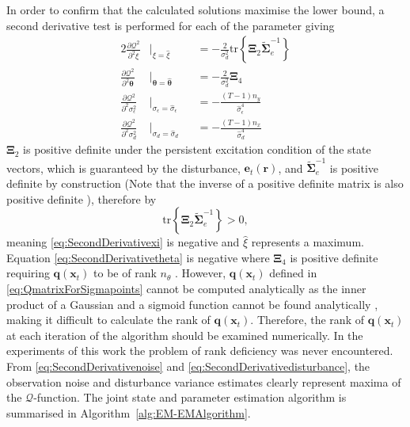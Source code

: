 \documentclass[]{article}
\begin{document}
In order to confirm that the calculated solutions maximise the lower bound, a second derivative test is performed for each of the parameter giving
\begin{alignat}{2}%
 \frac{\partial \mathcal Q^2}{\partial^2\xi}&\biggr\rvert_{\xi=\hat{\xi}}&&=-\frac{2}{\sigma_d^2}\mathrm{tr}\left\lbrace \boldsymbol\Xi_2 \tilde{\boldsymbol\Sigma}_e^{-1}\right\rbrace \label{eq:SecondDerivativexi}\\
 \frac{\partial \mathcal Q^2}{\partial^2\boldsymbol\theta}&\biggr\rvert_{\boldsymbol\theta=\hat{\boldsymbol\theta}}&&=-\frac{2}{\sigma_d^2}\boldsymbol\Xi_4 \label{eq:SecondDerivativetheta} \\
 \frac{\partial \mathcal Q^2}{\partial^2\sigma_{\epsilon}^2}&\biggr\rvert_{\sigma_{\epsilon}=\hat{\sigma}_{\epsilon}}&&=-\frac{(T-1)n_y}{\hat{\sigma}_{\epsilon}^4} \label{eq:SecondDerivativenoise} \\
 \frac{\partial \mathcal Q^2}{\partial^2\sigma_{d}^2}&\biggr\rvert_{{\sigma}_{d}=\hat{\sigma}_{d}}&&= -\frac{(T-1)n_x}{\hat{\sigma}_{d}^4} \label{eq:SecondDerivativedisturbance}
\end{alignat}
$\boldsymbol\Xi_2$ is positive definite under the persistent excitation condition of the state vectors, which is guaranteed by the disturbance, $\mathbf{e}_t(\mathbf r)$, and $\tilde{\boldsymbol\Sigma}_e^{-1}$ is positive definite by construction (Note that the inverse of a positive definite matrix is also positive definite \cite{Horn2005}), therefore by \cite{Coope1994}
\begin{equation}\label{eq:EM-traceinequality}
 \mathrm{tr}\left\lbrace \boldsymbol\Xi_2 \tilde{\boldsymbol\Sigma}_e^{-1}\right\rbrace >0,
\end{equation}
meaning \eqref{eq:SecondDerivativexi} is negative and $\hat{\xi}$ represents a maximum. Equation \eqref{eq:SecondDerivativetheta} is negative where $\boldsymbol\Xi_4$ is positive definite requiring $\mathbf q(\mathbf x_t)$ to be of rank $n_{\theta}$ \cite{Golub1996}.  However, $\mathbf q(\mathbf x_t)$ defined in \eqref{eq:QmatrixForSigmapoints} cannot be computed analytically as the inner product of a Gaussian and a sigmoid function cannot be found analytically \cite{MacKay1992}, making it difficult to calculate the rank of $\mathbf q(\mathbf x_t)$. Therefore, the rank of $\mathbf q(\mathbf x_t)$ at each iteration of the algorithm should be examined numerically. In the experiments of this work the problem of rank deficiency was never encountered. From \eqref{eq:SecondDerivativenoise} and \eqref{eq:SecondDerivativedisturbance}, the observation noise and disturbance variance estimates clearly represent maxima of the $\mathcal{Q}$-function. The joint state and parameter estimation algorithm is summarised in Algorithm~\ref{alg:EM-EMAlgorithm}.
\end{document}
